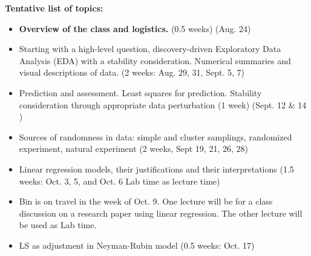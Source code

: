\documentclass[11pt]{article}
\begin{document}
\newpage

{\bf Tentative list of topics:}


\begin{itemize}

\item 
\textbf{Overview of the class and logistics.}
(0.5 weeks) (Aug. 24)

\item 
Starting with a high-level question, discovery-driven Exploratory Data Analysis (EDA) with a stability consideration. Numerical summaries and visual descriptions of data.
(2 weeks: Aug. 29, 31, Sept. 5, 7) 

\item Prediction and assessment. Least squares for prediction. 
Stability consideration through appropriate data perturbation (1 week) (Sept. 12 \& 14 )

\item Sources of randomness in data: simple and cluster samplings,
randomized experiment, natural experiment (2 weeks, Sept 19, 21, 26, 28) 

\item 
Linear regression models, their justifications and their interpretations 
(1.5 weeks: Oct. 3, 5, and Oct. 6 Lab time as lecture time)

\item Bin is on travel in the week of Oct. 9.
One lecture will be for a class discussion on a research paper using
linear regression. The other lecture will be used as Lab time.

\item LS as adjustment in Neyman-Rubin model (0.5 weeks: Oct. 17)


\end{itemize}
\end{document}
